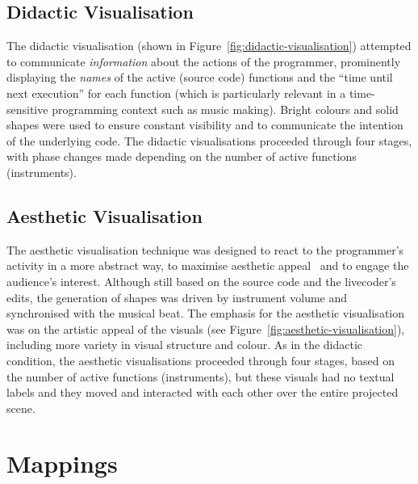 \subsection{Didactic Visualisation}
\label{sec:didactic-visualisation}

The didactic visualisation (shown in
Figure~\ref{fig:didactic-visualisation}) attempted to communicate
\emph{information} about the actions of the programmer, prominently
displaying the \emph{names} of the active (source code) functions and
the ``time until next execution'' for each function (which is
particularly relevant in a time-sensitive programming context such as
music making). Bright colours and solid shapes were used to ensure
constant visibility and to communicate the intention of the underlying
code. The didactic visualisations proceeded through four stages, with
phase changes made depending on the number of active functions
(instruments).

\subsection{Aesthetic Visualisation}
\label{sec:aesthetic-visualisation}

The aesthetic visualisation technique was designed
to react to the programmer's activity in a more abstract way, to
maximise aesthetic appeal~\cite{Cawthon2007} and to engage the
audience's interest. Although still based on the source code and the
livecoder's edits, the generation of shapes was driven by instrument
volume and synchronised with the musical beat. The emphasis for the
aesthetic visualisation was on the artistic appeal of the visuals (see
Figure~\ref{fig:aesthetic-visualisation}), including more variety in
visual structure and colour. As in the didactic condition, the
aesthetic visualisations proceeded through four stages, based on the
number of active functions (instruments), but these visuals had no
textual labels and they moved and interacted with each other over the
entire projected scene.

\section{Mappings}



